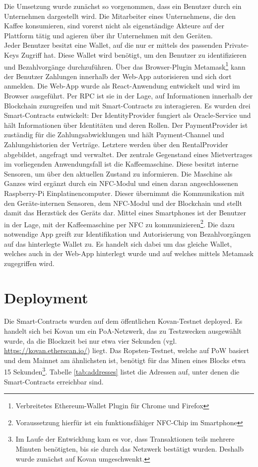 Die Umsetzung wurde zunächst so vorgenommen, dass ein Benutzer durch ein Unternehmen dargestellt wird. Die Mitarbeiter eines Unternehmens, die den Kaffee konsumieren, sind vorerst nicht als eigenständige Akteure auf der Plattform tätig und agieren über ihr Unternehmen mit den Geräten.\\
Jeder Benutzer besitzt eine Wallet, auf die nur er mittels des passenden Private-Keys Zugriff hat. Diese Wallet wird benötigt, um den Benutzer zu identifizieren und Bezahlvorgänge durchzuführen. Über das Browser-Plugin Metamask\footnote{Verbreitetes Ethereum-Wallet Plugin für Chrome und Firefox} kann der Benutzer Zahlungen innerhalb der Web-App autorisieren und sich dort anmelden. Die Web-App wurde als React-Anwendung entwickelt und wird im Browser ausgeführt. Per \ac{RPC} ist sie in der Lage, auf Informationen innerhalb der Blockchain zuzugreifen und mit Smart-Contracts zu interagieren. Es wurden drei Smart-Contracts entwickelt: Der IdentityProvider fungiert als Oracle-Service und hält Informationen über Identitäten und deren Rollen. Der PaymentProvider ist zuständig für die Zahlungsabwicklungen und hält Payment-Channel und Zahlungshistorien der Verträge. Letztere werden über den RentalProvider abgebildet, angefragt und verwaltet. Der zentrale Gegenstand eines Mietvertrages im vorliegenden Anwendungsfall ist die Kaffeemaschine. Diese besitzt interne Sensoren, um über den aktuellen Zustand zu informieren. Die Maschine als Ganzes wird ergänzt durch ein NFC-Modul und einen daran angeschlossenen Raspberry-Pi Einplatinencomputer. Dieser übernimmt die Kommunikation mit den Geräte-internen Sensoren, dem NFC-Modul und der Blockchain und stellt damit das Herzstück des Geräts dar. Mittel eines Smartphones ist der Benutzer in der Lage, mit der Kaffeemaschine per \ac{NFC} zu kommunizieren\footnote{Voraussetzung hierfür ist ein funktionsfähiger NFC-Chip im Smartphone}. Die dazu notwendige App greift zur Identifikation und Autorisierung von Bezahlvorgängen auf das hinterlegte Wallet zu. Es handelt sich dabei um das gleiche Wallet, welches auch in der Web-App hinterlegt wurde und auf welches mittels Metamask zugegriffen wird.

\section{Deployment}
\label{sec:implementation:poc:deployment}
Die Smart-Contracts wurden auf dem öffentlichen Kovan-Testnet deployed. Es handelt sich bei Kovan um ein \ac{PoA}-Netzwerk, das zu Testzwecken ausgewählt wurde, da die Blockzeit bei nur etwa vier Sekunden (vgl. \url{https://kovan.etherscan.io/}) liegt. Das Ropsten-Testnet, welche auf \ac{PoW} basiert und dem Mainnet am ähnlichsten ist, benötigt für das Minen eines Blocks etwa 15 Sekunden\footnote{Im Laufe der Entwicklung kam es vor, dass Transaktionen teils mehrere Minuten benötigten, bis sie durch das Netzwerk bestätigt wurden. Deshalb wurde zunächst auf Kovan umgeschwenkt.}. Tabelle \ref{tab:addresses} listet die Adressen auf, unter denen die Smart-Contracts erreichbar sind.

